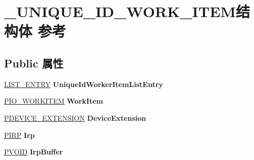 \hypertarget{struct___u_n_i_q_u_e___i_d___w_o_r_k___i_t_e_m}{}\section{\+\_\+\+U\+N\+I\+Q\+U\+E\+\_\+\+I\+D\+\_\+\+W\+O\+R\+K\+\_\+\+I\+T\+E\+M结构体 参考}
\label{struct___u_n_i_q_u_e___i_d___w_o_r_k___i_t_e_m}
\subsection*{Public 属性}
\begin{DoxyCompactItemize}
\item 
\mbox{\label{struct___u_n_i_q_u_e___i_d___w_o_r_k___i_t_e_m_a3a6f024eb614009d247988b9781960d7}} 
\hyperlink{struct___l_i_s_t___e_n_t_r_y}{L\+I\+S\+T\+\_\+\+E\+N\+T\+RY} {\bfseries Unique\+Id\+Worker\+Item\+List\+Entry}
\item 
\mbox{\label{struct___u_n_i_q_u_e___i_d___w_o_r_k___i_t_e_m_afaf734f842d70d6e7a2f35334734aa45}} 
\hyperlink{struct___i_o___w_o_r_k_i_t_e_m}{P\+I\+O\+\_\+\+W\+O\+R\+K\+I\+T\+EM} {\bfseries Work\+Item}
\item 
\mbox{\label{struct___u_n_i_q_u_e___i_d___w_o_r_k___i_t_e_m_ae58b8aae7eaadde319669069eefd87aa}} 
\hyperlink{struct___b_e_e_p___d_e_v_i_c_e___e_x_t_e_n_s_i_o_n}{P\+D\+E\+V\+I\+C\+E\+\_\+\+E\+X\+T\+E\+N\+S\+I\+ON} {\bfseries Device\+Extension}
\item 
\mbox{\label{struct___u_n_i_q_u_e___i_d___w_o_r_k___i_t_e_m_a5b033e16d62a725dd5207c9279bb79f7}} 
\hyperlink{interfacevoid}{P\+I\+RP} {\bfseries Irp}
\item 
\mbox{\label{struct___u_n_i_q_u_e___i_d___w_o_r_k___i_t_e_m_a2e24e35d01238cf375398756550f4971}} 
\hyperlink{interfacevoid}{P\+V\+O\+ID} {\bfseries Irp\+Buffer}
\item 
\mbox{\label{struct___u_n_i_q_u_e___i_d___w_o_r_k___i_t_e_m_aaf9cda286c4327ffa6aa7e9a76908820}} 

\end{DoxyCompactItemize}
